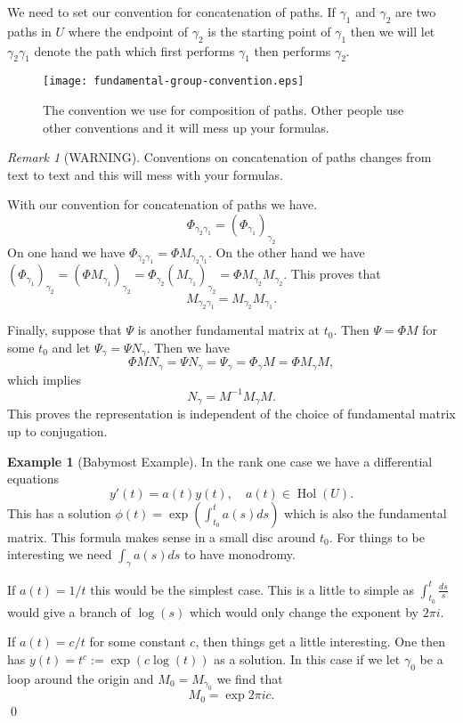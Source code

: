 \documentclass[]{book}
\numberwithin{equation}{section}
\theoremstyle{definition}
\newtheorem{example}[theorem]{Example}
\theoremstyle{remark}
\newtheorem{remark}[theorem]{Remark}
\newcommand{\hol}{\operatorname{Hol}}
\begin{document}
We need to set our convention for concatenation of paths. 
If $\gamma_1$ and $\gamma_2$ are two paths in $U$ where the endpoint of $\gamma_2$ is the starting point of $\gamma_1$ then we will let $\gamma_2\gamma_1$ denote the path which first performs $\gamma_1$ then performs $\gamma_2$. 

\begin{figure}[h]
\begin{center}
\texttt{[image: fundamental-group-convention.eps]}\label{F:fundamental-group-convention}
\end{center}
\caption{The convention we use for composition of paths. Other people use other conventions and it will mess up your formulas.}
\end{figure}

\begin{remark}[WARNING]
	Conventions on concatenation of paths changes from text to text and this will mess with your formulas.
\end{remark}

With our convention for concatenation of paths we have.
 $$ \Phi_{\gamma_2\gamma_1} = (\Phi_{\gamma_1})_{\gamma_2}$$
On one hand we have $\Phi_{\gamma_2\gamma_1} = \Phi M_{\gamma_2\gamma_1}.$
On the other hand we have $ (\Phi_{\gamma_1})_{\gamma_2}= (\Phi M_{\gamma_1})_{\gamma_2} = \Phi_{\gamma_2} (M_{\gamma_1})_{\gamma_2} = \Phi M_{\gamma_2} M_{\gamma_2}.$
This proves that 
 $$ M_{\gamma_2\gamma_1} = M_{\gamma_2}M_{\gamma_1}.$$

Finally, suppose that $\Psi$ is another fundamental matrix at $t_0$.
Then $\Psi = \Phi M$ for some $t_0$ and let $\Psi_{\gamma} = \Psi N_{\gamma}$. 
Then we have 
 $$\Phi M N_{\gamma} =\Psi N_{\gamma}  =\Psi_{\gamma} = \Phi_{\gamma} M = \Phi M_{\gamma} M, $$
which implies 
 $$ N_{\gamma} = M^{-1} M_{\gamma} M .$$
 This proves the representation is independent of the choice of fundamental matrix up to conjugation.

\begin{example}[Babymost Example]
	In the rank one case we have a differential equations 
	 $$ y'(t) = a(t) y(t), \quad a(t) \in \hol(U). $$
	This has a solution $\phi(t) = \exp( \int_{t_0}^t a(s) ds)$ which is also the fundamental matrix. 
	This formula makes sense in a small disc around $t_0$.
	For things to be interesting we need  $ \int_{\gamma} a(s) ds $ to have monodromy.
	
	If $a(t) = 1/t$ this would be the simplest case. 
	This is a little to simple as $\int_{t_0}^t \frac{ds}{s}$ would give a branch of $\log(s)$ which would only change the exponent by $2\pi i$.
	
	If $a(t) = c/t$ for some constant $c$, then things get a little interesting. 
	One then has $y(t) = t^{c} := \exp( c \log(t))$ as a solution. 
	In this case if we let $\gamma_0$ be a loop around the origin and $M_0 = M_{\gamma_0}$ we find that 
	$$M_{0} = \exp{2 \pi i c}.$$
	\qed
\end{example}
\end{document}
